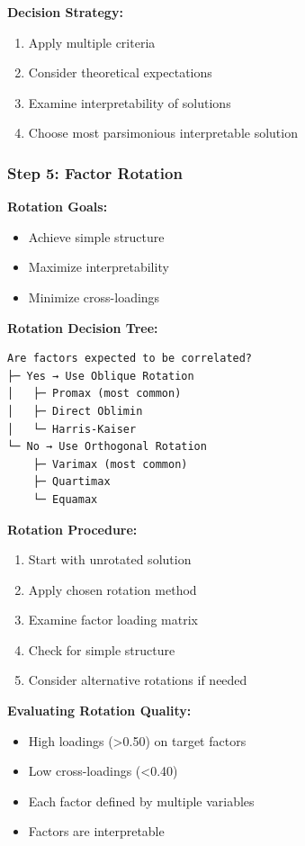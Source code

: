 \documentclass[
]{article}
\begin{document}
\textbf{Decision Strategy:}

\begin{enumerate}
\item
  Apply multiple criteria
\item
  Consider theoretical expectations
\item
  Examine interpretability of solutions
\item
  Choose most parsimonious interpretable solution
\end{enumerate}

\subsubsection{Step 5: Factor Rotation}

\textbf{Rotation Goals:}

\begin{itemize}
\item
  Achieve simple structure
\item
  Maximize interpretability
\item
  Minimize cross-loadings
\end{itemize}

\textbf{Rotation Decision Tree:}

\begin{verbatim}
Are factors expected to be correlated?
├─ Yes → Use Oblique Rotation
│   ├─ Promax (most common)
│   ├─ Direct Oblimin
│   └─ Harris-Kaiser
└─ No → Use Orthogonal Rotation
    ├─ Varimax (most common)
    ├─ Quartimax
    └─ Equamax
\end{verbatim}

\textbf{Rotation Procedure:}

\begin{enumerate}
\item
  Start with unrotated solution
\item
  Apply chosen rotation method
\item
  Examine factor loading matrix
\item
  Check for simple structure
\item
  Consider alternative rotations if needed
\end{enumerate}

\textbf{Evaluating Rotation Quality:}

\begin{itemize}
\item
  High loadings (\textgreater0.50) on target factors
\item
  Low cross-loadings (\textless0.40)
\item
  Each factor defined by multiple variables
\item
  Factors are interpretable
\end{itemize}
\end{document}
